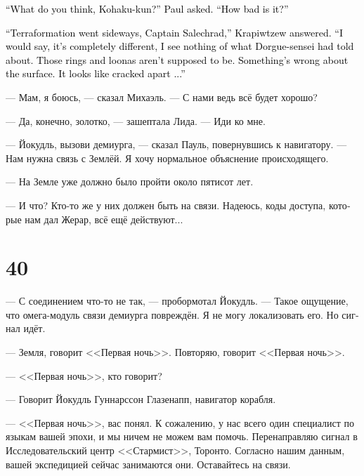 \documentclass[a4paper,12pt,fleqn]{book}\usepackage{cooltooltips}\usepackage{polyglossia}\setdefaultlanguage[babelshorthands=true]{russian}\setotherlanguage{english}\defaultfontfeatures{Ligatures=TeX,Mapping=tex-text} \usepackage{xcolor}\definecolor{lightgray}{HTML}{bbbbbb}\color{lightgray}\newcommand{\ml}[3]{\textenglish{\textcolor{black}{#3}}}
\newcommand{\asterism}{\vspace{1em}{\centering\Large\bfseries$\ast~\ast~\ast$\par}\vspace{1em}}
\begin{document}
\ml{$0$}
{--- Что скажешь, Кохаку-кун? --- спросил Пауль.}
{``What do you think, Kohaku-kun?'' Paul asked.}
\ml{$0$}
{--- Всё плохо?}
{``How bad is it?''}

\ml{$0$}
{--- Терраформирование прошло не по плану, капитан Салехрад, --- ответили Крапивцев.}
{``Terraformation went sideways, Captain Salechrad,'' Krapiwtzew answered.}
\ml{$0$}
{--- Я бы сказали, она совсем другая, я не вижу ничего из того, о чём говорил Дорге-сенсей.}
{``I would say, it's completely different, I see nothing of what Dorgue-sensei had told about.}
\ml{$0$}
{Вот этиx колец и лун быть не должно.}
{Those rings and loonas aren't supposed to be.}
\ml{$0$}
{С поверхностью что-то не так.}
{Something's wrong about the surface.}
\ml{$0$}
{Она как будто растрескалась на куски...}
{It looks like cracked apart ...''}

--- Мам, я боюсь, --- сказал Михаэль.
--- С нами ведь всё будет хорошо?

--- Да, конечно, золотко, --- зашептала Лида.
--- Иди ко мне.

--- Йокудль, вызови демиурга, --- сказал Пауль, повернувшись к навигатору.
--- Нам нужна связь с Землёй.
Я хочу нормальное объяснение происходящего.

--- На Земле уже должно было пройти около пятисот лет.

--- И что?
Кто-то же у них должен быть на связи.
Надеюсь, коды доступа, которые нам дал Жерар, всё ещё действуют...

\section{40}

--- С соединением что-то не так, --- пробормотал Йокудль.
--- Такое ощущение, что омега-модуль связи демиурга повреждён.
Я не могу локализовать его.
Но сигнал идёт.

\asterism

--- Земля, говорит <<Первая ночь>>.
Повторяю, говорит <<Первая ночь>>.

--- <<Первая ночь>>, кто говорит?

--- Говорит Йокудль Гуннарссон Глазенапп, навигатор корабля.

--- <<Первая ночь>>, вас понял.
К сожалению, у нас всего один специалист по языкам вашей эпохи, и мы ничем не можем вам помочь.
Перенаправляю сигнал в Исследовательский центр <<Стармист>>, Торонто.
Согласно нашим данным, вашей экспедицией сейчас занимаются они.
Оставайтесь на связи.
\end{document}
